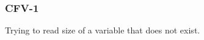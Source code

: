 \subsubsection{CFV-1}\label{sec:error_code_cfv_1}

Trying to read size of a variable that does not exist.


